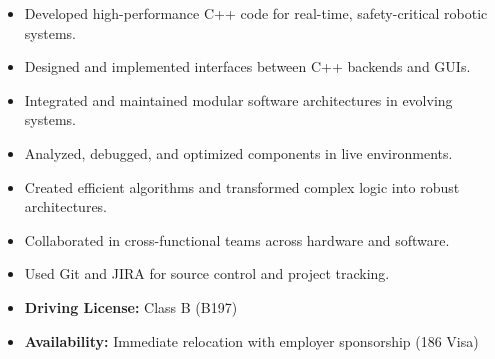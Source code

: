 \documentclass[10pt,a4paper,ragged2e,withhyper]{altacv}
\begin{document}
\begin{paracol}{2}
	\begin{itemize}
		\item Developed high-performance C++ code for real-time, safety-critical robotic systems.
		\item Designed and implemented interfaces between C++ backends and GUIs.
		\item Integrated and maintained modular software architectures in evolving systems.
		\item Analyzed, debugged, and optimized components in live environments.
		\item Created efficient algorithms and transformed complex logic into robust architectures.
		\item Collaborated in cross-functional teams across hardware and software.
		\item Used Git and JIRA for source control and project tracking.
	\end{itemize}


	\begin{itemize}
	  \item \textbf{Driving License:} Class B (B197)
	  \item \textbf{Availability:} Immediate relocation with employer sponsorship (186 Visa)
	\end{itemize}




	\switchcolumn


	

\end{paracol}
\end{document}
